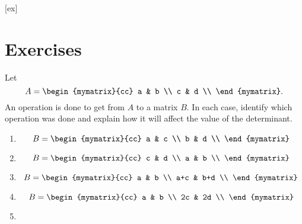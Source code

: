 [ex]
\section*{Exercises}


\begin{ex}
  Let 
  \begin{equation*}
    A = \begin{mymatrix}{cc}
      a & b \\
      c & d \\
    \end{mymatrix}.
  \end{equation*}
  An operation is done to get from $A$ to a matrix $B$. In each case,
  identify which operation was done and explain how it will affect the
  value of the determinant.
  \begin{enumerate}
  \item
    \begin{equation*}
      B = \begin{mymatrix}{cc}
        a & c \\
        b & d \\
      \end{mymatrix}
    \end{equation*}
  \item
    \begin{equation*}
      B = \begin{mymatrix}{cc}
        c & d \\
        a & b \\
      \end{mymatrix}
    \end{equation*}
  \item
    \begin{equation*}
      B = \begin{mymatrix}{cc}
        a   & b   \\
        a+c & b+d \\
      \end{mymatrix}
    \end{equation*}
  \item
    \begin{equation*}
      B = \begin{mymatrix}{cc}
        a  & b  \\
        2c & 2d \\
      \end{mymatrix}
    \end{equation*}
  \item

\end{enumerate}
\end{ex}
